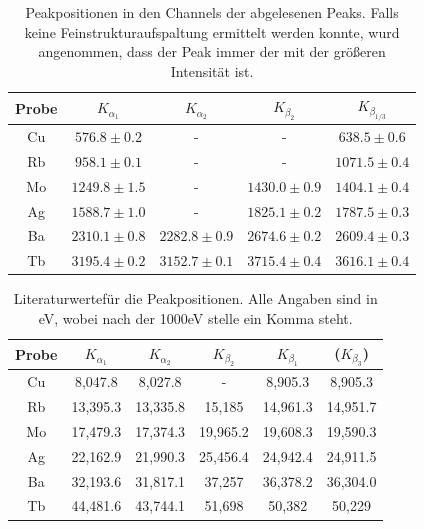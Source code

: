 \documentclass[12pt,a4paper]{article}
\begin{document}
\begin{table}
\centering
\begin{tabular}{|c|c|c|c|c|}
\hline 
Probe & $K_{\alpha_1}$ & $K_{\alpha_2}$ & $K_{\beta_2}$ & $K_{\beta_{1/3}}$ \\ 
\hline 
Cu & $576.8\pm0.2$ & - & -& $638.5\pm0.6$\\ 
\hline 
Rb & $958.1\pm0.1$ & - & -& $1071.5\pm0.4$\\ 
\hline 
Mo & $1249.8\pm1.5$ & - & $1430.0\pm0.9$ & $1404.1\pm0.4$ \\ 
\hline 
Ag & $1588.7\pm1.0$ & - & $1825.1\pm0.2$ & $1787.5\pm0.3$ \\ 
\hline 
Ba & $2310.1\pm0.8$ & $2282.8\pm0.9$ & $2674.6\pm0.2$ & $2609.4\pm0.3$ \\ 
\hline 
Tb & $3195.4\pm0.2$ & $3152.7\pm0.1$ & $3715.4\pm0.4$ & $3616.1\pm0.4$ \\ 
\hline 
\end{tabular} 
\caption{Peakpositionen in den Channels der abgelesenen Peaks. Falls keine Feinstrukturaufspaltung ermittelt werden konnte, wurd angenommen, dass der Peak immer der mit der größeren Intensität ist.}
\label{tab:alpha_kal}
\end{table}

\begin{table}
\centering
\begin{tabular}{|c|c|c|c|c|c|}
\hline 
Probe & $K_{\alpha_1}$ & $K_{\alpha_2}$ & $K_{\beta_2}$ & $K_{\beta_{1}}$ & ($K_{\beta_{3}}$) \\ 
\hline 
Cu & 8,047.8 & 8,027.8 & - & 8,905.3 & 8,905.3\\ 
\hline 
Rb & 13,395.3 & 13,335.8  & 15,185 & 14,961.3 & 14,951.7\\ 
\hline 
Mo & 17,479.3 & 17,374.3 & 19,965.2  & 19,608.3 & 19,590.3\\ 
\hline 
Ag & 22,162.9 & 21,990.3 & 25,456.4 & 24,942.4 & 24,911.5\\ 
\hline 
Ba & 32,193.6 & 31,817.1 & 37,257 & 36,378.2 & 36,304.0\\ 
\hline 
Tb & 44,481.6 & 43,744.1 & 51,698 & 50,382 & 50,229\\ 
\hline 
\end{tabular} 
\caption[test]{Literaturwerte\footnotemark für die Peakpositionen. Alle Angaben sind in eV, wobei nach der 1000eV stelle ein Komma steht.}
\label{tab:alpha_lit}
\end{table}
\end{document}
